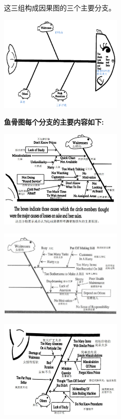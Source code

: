这三组构成因果图的三个主要分支。


\includegraphics[width=6cm]{club111.png}

\textbf{鱼骨图每个分支的主要内容如下:}


\includegraphics[width=6cm]{club121.jpg}


\includegraphics[width=6cm]{club131.jpg}


\includegraphics[width=6cm]{club141.jpg}

